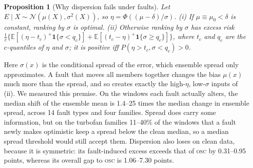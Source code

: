 \documentclass{esannV2}
\newtheorem{proposition}{Proposition}
\newcommand{\OSC}{\textsc{osc}}
\begin{document}
\begin{proposition}[Why dispersion fails under faults]\label{prop:gauss}
Let $E\mid X\sim\mathcal N(\mu(X),\sigma^2(X))$, so $\eta=\Phi((\mu-\delta)/\sigma)$. (i) If $\mu\equiv\mu_0<\delta$ is constant, ranking by $\sigma$ is optimal. (ii) Otherwise ranking by $\sigma$ has excess risk $\frac1c\{\mathbb E[(\eta-t_c)^+\mathbf 1\{\sigma<q_c\}]+\mathbb E[(t_c-\eta)^+\mathbf 1\{\sigma\ge q_c\}]\}$, where $t_c$ and $q_c$ are the $c$-quantiles of $\eta$ and $\sigma$; it is positive iff $P(\eta>t_c,\sigma<q_c)>0$.
\end{proposition}
\noindent Here $\sigma(x)$ is the conditional spread of the error, which ensemble spread only approximates. A fault that moves all members together changes the bias $\mu(x)$ much more than the spread, and so creates exactly the high-$\eta$, low-$\sigma$ inputs of (ii). We measured this premise. On the windows each fault actually alters, the median shift of the ensemble mean is 1.4--25 times the median change in ensemble spread, across 14 fault types and four families. Spread does carry some information, but on the turbofan families 11--40\% of the windows that a fault newly makes optimistic keep a spread below the clean median, so a median spread threshold would still accept them. Dispersion also loses on clean data, because it is symmetric: its fault-induced excess exceeds that of \OSC{} by 0.31--0.95 points, whereas its overall gap to \OSC{} is 1.06--7.30 points.
\end{document}
